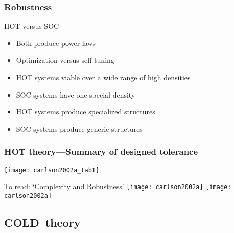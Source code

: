 \begin{frame}
  \frametitle{Robustness}

  \begin{block}{HOT versus SOC}

    \begin{itemize}
    \item<1-> Both produce power laws
    \item<2-> Optimization versus self-tuning
    \item<3-> HOT systems viable over a wide range of high densities
    \item<4-> SOC systems have one special density
    \item<5-> HOT systems produce specialized structures
    \item<6-> SOC systems produce generic structures
    \end{itemize}
    
  \end{block}

\end{frame}

\begin{frame}
  \frametitle{HOT theory---Summary of designed tolerance\cite{carlson2002a}}

  \begin{block}{}
  \begin{center}
    \texttt{[image: carlson2002a\_tab1]}
  \end{center}
  \end{block}

\end{frame}


\begin{frame}
  \begin{block}{To read: `Complexity and Robustness'\cite{carlson2002a}}
      \texttt{[image: carlson2002a]}
      \texttt{[image: carlson2002a]}
  \end{block}
\end{frame}


\subsection{COLD\ theory}

